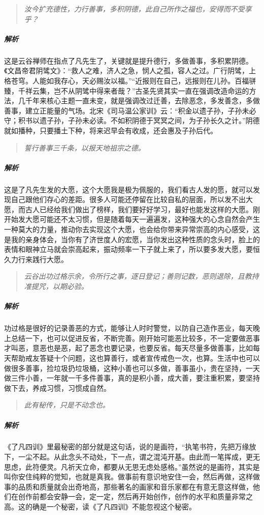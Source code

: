 \begin{quote}\it
    汝今扩充德性，力行善事，多积阴德，此自己所作之福也，安得而不受享乎？
\end{quote}

\subparagraph{解析} 这是云谷禅师在指点了凡先生了，关键就是提升德行，多做善事，多积累阴德。《文昌帝君阴骘文》：“救人之难，济人之急，悯人之孤，容人之过。广行阴骘，上格苍穹。人能如我存心，天必赐汝以福。”“近报则在自己，远报则在儿孙。百福骈臻，千祥云集，岂不从阴骘中得来者哉？”古圣先贤其实一直在强调改造命运的方法，几千年来核心主题一直未变，就是强调改过迁善，去除恶念，多发善念，多做善事，建立正能量的气场。北宋《司马温公家训》云：“积金以遗子孙，子孙未必守；积书以遗子孙，子孙未必读。不如积阴德于冥冥之间，为子孙长久之计。”阴德就如播种，只要播土下种，将来迟早会有收成，还会惠及子孙后代。

\begin{quote}\it
    誓行善事三千条，以报天地祖宗之德。
\end{quote}

\subparagraph{解析} 这是了凡先生发的大愿，这个大愿我是极为佩服的，我们看古人发的愿，就可以发现自己跟他们存心的差距。很多人可能还停留在比较自私的层面，所以发不出大愿，而古人已经给我们做出了榜样，我们要好好学习，最好也能发这样的大愿。刚开始发大愿可能还不太习惯，但是随着每天一遍遍发，这种强大的心念自然会产生一种莫大的力量，推动你去实现这个大愿，也会给你带来异常崇高的内心感受，这是我的亲身体会，当你有了济世度人的宏愿，当你发出这种性质的念头时，脸上的表情和眼神立马就会崇高起来，振动频率一下子就上来了，所以要多发大愿，要恒久力行来践行大愿。

\begin{quote}\it
    云谷出功过格示余，令所行之事，逐日登记；善则记数，恶则退除，且教持准提咒，以期必验。
\end{quote}

\subparagraph{解析} 功过格是很好的记录善恶的方式，能够让人时时警觉，以防自己造作恶业，每天晚上总结一下，也可以促进反省，不断完善。刚开始可能恶比较多，不一定要做恶事才叫恶，意恶也是恶，起了恶念也要记录，也要反省。每天尽量多做善事，比如每天帮助戒友答疑十个问题，这也算善行，或者宣传戒色一次，也算。生活中也可以做很多善事，捡垃圾扔垃圾桶，这种小善也可以多做，善事虽小，贵在坚持，一天做三件小善，一年就一千多件善事，真的是积小善，成大善，要注重积累，要坚持做下去，养成习惯，习惯成自然。

\begin{quote}\it
    此有秘传，只是不动念也。
\end{quote}

\subparagraph{解析} 《了凡四训》里最秘密的部分就是这句话，说的是画符，“执笔书符，先把万缘放下，一尘不起。从此念头不动处，下一点，谓之混沌开基。由此而一笔挥成，更无思虑，此符便灵。凡祈天立命，都要从无思无虑处感格。”虽然说的是画符，其实是叫你安住纯粹的觉知，也就是真我。做事前有意识地安住一会，然后再做，这样做事的品质和质量就会出奇地高，那些著名的画家和音乐家都在有意无意这样做，他们在创作前都会安静一会，定一定，然后再开始创作，创作的水平和质量非常之高。这的确是一个秘密，读《了凡四训》不能忽视这个秘密。

